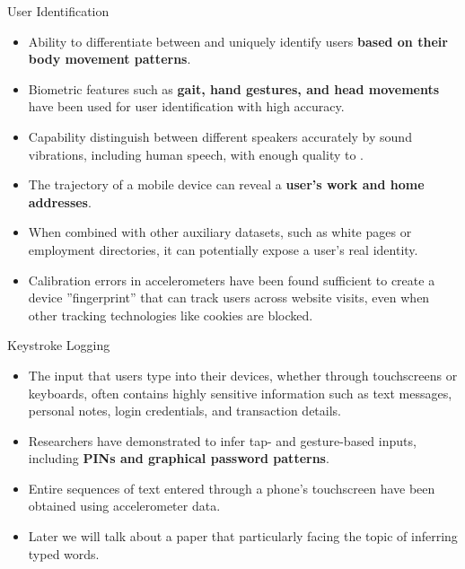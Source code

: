 \documentclass[ucs,9pt]{beamer}
\begin{document}
\begin{frame}{User Identification}
\begin{itemize}
	\item Ability to differentiate between and uniquely identify users
	\textbf{based on their body movement patterns}. 
	\item Biometric features such as \textbf{gait, hand gestures, and head movements}  have been used for user identification with high
	accuracy. %
	\item Capability distinguish between different speakers accurately by sound vibrations, including human speech, with enough quality to .
	\item The trajectory of a mobile device can reveal a \textbf{user’s work and home addresses}. 
	\item When combined with other auxiliary datasets, such as white pages
	or employment directories, it can potentially expose a user’s
	real identity.
	\item Calibration errors in accelerometers %
	have been found sufficient to create a device ”fingerprint” that can track users across website visits, even when other tracking technologies like cookies are
	blocked.
\end{itemize}
\end{frame}


\begin{frame}{Keystroke Logging}
  \begin{itemize}
  	\item The input that users type into their devices, whether through touchscreens or keyboards, often contains highly sensitive information such as text messages, personal notes, login credentials, and transaction details. 
  	\item Researchers have demonstrated to infer tap- and gesture-based inputs, including \textbf{PINs and graphical password patterns}. 
  	\item Entire sequences of text entered through a phone’s touchscreen have been obtained using accelerometer data. 
  	\pause
  	\item \alert{Later we will talk about a paper that particularly facing the topic of inferring typed words.}
  \end{itemize}
\end{frame}
\end{document}
